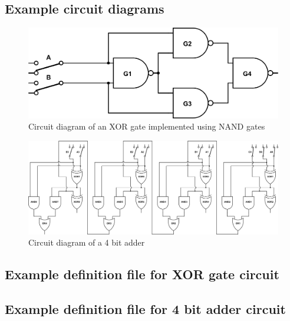 \documentclass[a4paper,10pt]{article}
\begin{document}
\subsection{Example circuit diagrams}
\begin{figure}[h]
 \centering
 \includegraphics[width=14cm]{../examples/xor.png}
 \caption{Circuit diagram of an XOR gate implemented using NAND gates}
 \label{fig:example-xor}
\end{figure}

\begin{figure}[h]
 \centering
 \includegraphics[width=16cm]{../examples/4-bit-adder.png}
 \caption{Circuit diagram of a 4 bit adder}
 \label{fig:example-adder}
\end{figure}


\subsection{Example definition file for XOR gate circuit}


\subsection{Example definition file for 4 bit adder circuit}

\end{document}
